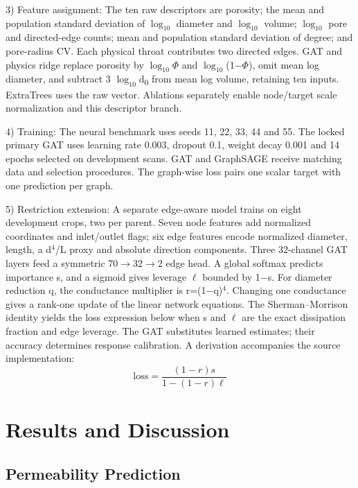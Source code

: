 \documentclass[a4paper]{svproc}
\begin{document}
3) Feature assignment: The ten raw descriptors are porosity; the mean and population standard deviation of \ensuremath{\log_{10}} diameter and \ensuremath{\log_{10}} volume; \ensuremath{\log_{10}} pore and directed-edge counts; mean and population standard deviation of degree; and pore-radius CV. Each physical throat contributes two directed edges. GAT and physics ridge replace porosity by \ensuremath{\log_{10}}\ensuremath{\Phi} and \ensuremath{\log_{10}}(1\ensuremath{-}\ensuremath{\Phi}), omit mean log diameter, and subtract 3 \ensuremath{\log_{10}}d\textsubscript{0} from mean log volume, retaining ten inputs. ExtraTrees uses the raw vector. Ablations separately enable node/target scale normalization and this descriptor branch.

4) Training: The neural benchmark uses seeds 11, 22, 33, 44 and 55. The locked primary GAT uses learning rate 0.003, dropout 0.1, weight decay 0.001 and 14 epochs selected on development scans. GAT and GraphSAGE receive matching data and selection procedures. The graph-wise loss pairs one scalar target with one prediction per graph.

5) Restriction extension: A separate edge-aware model trains on eight development crops, two per parent. Seven node features add normalized coordinates and inlet/outlet flags; six edge features encode normalized diameter, length, a d\ensuremath{^{4}}/L proxy and absolute direction components. Three 32-channel GAT layers feed a symmetric 70\ensuremath{\rightarrow}32\ensuremath{\rightarrow}2 edge head. A global softmax predicts importance s, and a sigmoid gives leverage \ensuremath{\ell} bounded by 1\ensuremath{-}s. For diameter reduction q, the conductance multiplier is r=(1\ensuremath{-}q)\ensuremath{^{4}}. Changing one conductance gives a rank-one update of the linear network equations. The Sherman--Morrison identity \cite{r16} yields the loss expression below when s and \ensuremath{\ell} are the exact dissipation fraction and edge leverage. The GAT substitutes learned estimates; their accuracy determines response calibration. A derivation accompanies the source implementation:
\[
\mathrm{loss}=\frac{\left( 1-r\right)s}{1-\left( 1-r\right)\ell }
\]
\section{Results and Discussion}

\subsection{Permeability Prediction}
\end{document}
